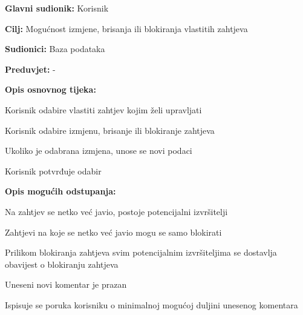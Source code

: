 			
		
			\noindent {}
			\begin{packed_item}
				
				\item \textbf{Glavni sudionik: }Korisnik
				\item  \textbf{Cilj:} Mogućnost izmjene, brisanja ili blokiranja vlastitih zahtjeva
				\item  \textbf{Sudionici:} Baza podataka
				\item  \textbf{Preduvjet:} -
				\item  \textbf{Opis osnovnog tijeka:}
				
				\item[] \begin{packed_enum}
					
					\item Korisnik odabire vlastiti zahtjev kojim želi upravljati
					\item Korisnik odabire izmjenu, brisanje ili blokiranje zahtjeva
					\item Ukoliko je odabrana izmjena, unose se novi podaci 
					\item Korisnik potvrđuje odabir

				\end{packed_enum}
				
				\item  \textbf{Opis mogućih odstupanja:}
				
				\item[] \begin{packed_item}
					
					
					\item[2.a] Na zahtjev se netko već javio, postoje potencijalni izvršitelji
					\item[] \begin{packed_enum}
						
						\item Zahtjevi na koje se netko već javio mogu se samo blokirati
						\item Prilikom blokiranja zahtjeva svim potencijalnim izvršiteljima se dostavlja obavijest o blokiranju zahtjeva
						
					\end{packed_enum}
					\item[3.a] Uneseni novi komentar je prazan
					\item[] \begin{packed_enum}
						
						\item Ispisuje se poruka korisniku o minimalnoj mogućoj duljini unesenog komentara
						
					\end{packed_enum}
										
				\end{packed_item}
			\end{packed_item}
		
